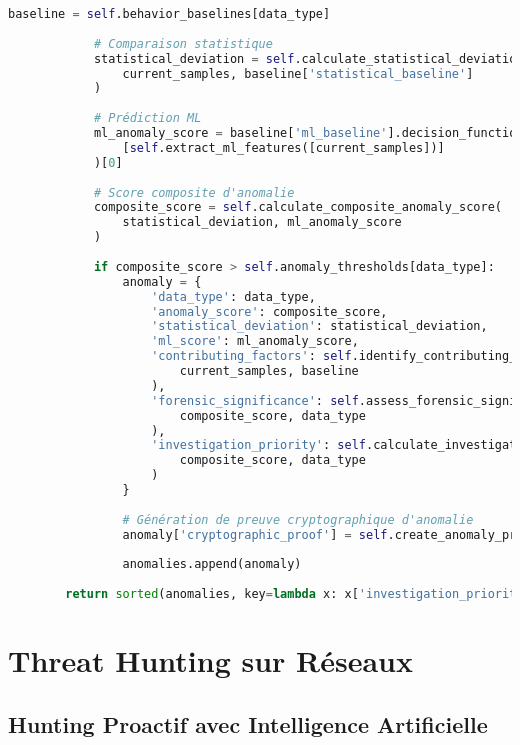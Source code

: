 \begin{lstlisting}[language=Python, caption=Moteur de corrélation comportementale]
            baseline = self.behavior_baselines[data_type]
            
            # Comparaison statistique
            statistical_deviation = self.calculate_statistical_deviation(
                current_samples, baseline['statistical_baseline']
            )
            
            # Prédiction ML
            ml_anomaly_score = baseline['ml_baseline'].decision_function(
                [self.extract_ml_features([current_samples])]
            )[0]
            
            # Score composite d'anomalie
            composite_score = self.calculate_composite_anomaly_score(
                statistical_deviation, ml_anomaly_score
            )
            
            if composite_score > self.anomaly_thresholds[data_type]:
                anomaly = {
                    'data_type': data_type,
                    'anomaly_score': composite_score,
                    'statistical_deviation': statistical_deviation,
                    'ml_score': ml_anomaly_score,
                    'contributing_factors': self.identify_contributing_factors(
                        current_samples, baseline
                    ),
                    'forensic_significance': self.assess_forensic_significance(
                        composite_score, data_type
                    ),
                    'investigation_priority': self.calculate_investigation_priority(
                        composite_score, data_type
                    )
                }
                
                # Génération de preuve cryptographique d'anomalie
                anomaly['cryptographic_proof'] = self.create_anomaly_proof(anomaly)
                
                anomalies.append(anomaly)
                
        return sorted(anomalies, key=lambda x: x['investigation_priority'], reverse=True)
\end{lstlisting}

\section{Threat Hunting sur Réseaux}

\subsection{Hunting Proactif avec Intelligence Artificielle}

